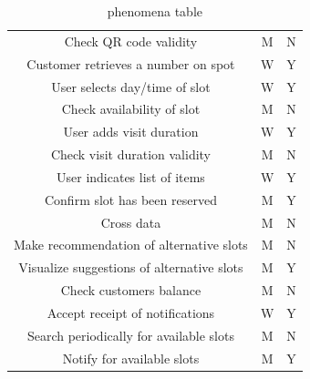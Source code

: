 \documentclass[table, 12pt]{article}
\begin{document}
\begin{flushleft}
\begin{center}
\begin{table}
\begin{tabularx}{\textwidth}{| c| c| c|}
                Check QR code validity                     & M                & N          \\
                Customer retrieves a number on spot        & W                & Y          \\
                User selects day/time of slot              & W                & Y          \\
                Check availability of slot                 & M                & N          \\
                User adds visit duration                   & W                & Y          \\
                Check visit duration validity              & M                & N          \\
                User indicates list of items               & W                & Y          \\
                Confirm slot has been reserved             & M                & Y          \\
                Cross data                                 & M                & N          \\
                Make recommendation of alternative slots   & M                & N          \\
                Visualize suggestions of alternative slots & M                & Y          \\
                Check customers balance                    & M                & N          \\
                Accept receipt of notifications            & W                & Y          \\
                Search periodically for available slots    & M                & N          \\
                Notify for available slots                 & M                & Y          \\

                \hline
            \end{tabularx}
            \caption{phenomena table}
        \end{table}
    \end{center}
    \newpage

\end{flushleft}
\end{document}
